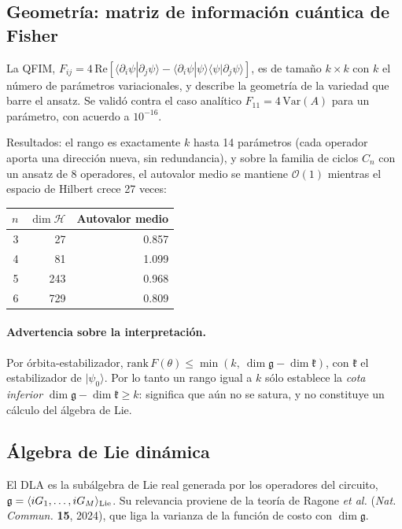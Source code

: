 \documentclass[11pt,a4paper]{article}
\newcommand{\ket}[1]{\lvert #1 \rangle}
\newcommand{\gm}{\mathfrak{g}}
\begin{document}
\subsection{Geometría: matriz de información cuántica de Fisher}

La QFIM,
$F_{ij} = 4\,\mathrm{Re}[\langle\partial_i\psi|\partial_j\psi\rangle - \langle\partial_i\psi|\psi\rangle\langle\psi|\partial_j\psi\rangle]$,
es de tamaño $k\times k$ con $k$ el número de parámetros variacionales, y
describe la geometría de la variedad que barre el ansatz. Se validó contra el
caso analítico $F_{11} = 4\,\mathrm{Var}(A)$ para un parámetro, con acuerdo a
$10^{-16}$.

Resultados: el rango es exactamente $k$ hasta 14 parámetros (cada operador
aporta una dirección nueva, sin redundancia), y sobre la familia de ciclos
$C_n$ con un ansatz de 8 operadores, el autovalor medio se mantiene
$\mathcal O(1)$ mientras el espacio de Hilbert crece 27 veces:

\begin{center}
\begin{tabular}{rrr}
\toprule
$n$ & $\dim\mathcal H$ & Autovalor medio \\
\midrule
3 & 27 & 0.857 \\
4 & 81 & 1.099 \\
5 & 243 & 0.968 \\
6 & 729 & 0.809 \\
\bottomrule
\end{tabular}
\end{center}

\paragraph{Advertencia sobre la interpretación.} Por órbita-estabilizador,
$\mathrm{rank}\,F(\theta) \le \min(k,\ \dim\gm - \dim\mathfrak{k})$, con
$\mathfrak k$ el estabilizador de $\ket{\psi_0}$. Por lo tanto un rango igual a
$k$ sólo establece la \emph{cota inferior} $\dim\gm - \dim\mathfrak k \ge k$:
significa que aún no se satura, y no constituye un cálculo del álgebra de Lie.

\subsection{Álgebra de Lie dinámica}

El DLA es la subálgebra de Lie real generada por los operadores del circuito,
$\gm = \langle iG_1,\dots,iG_M\rangle_{\rm Lie}$. Su relevancia proviene de la
teoría de Ragone \emph{et al.} (\emph{Nat. Commun.} \textbf{15}, 2024), que
liga la varianza de la función de costo con $\dim\gm$.
\end{document}
